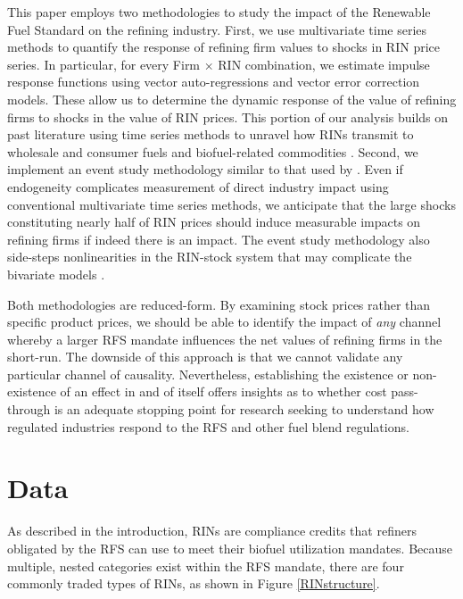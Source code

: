 \documentclass[11pt]{article}
\begin{document}
This paper employs two methodologies to study the impact of the Renewable Fuel Standard on the refining industry. First, we use multivariate time series methods to quantify the response of refining firm values to shocks in RIN price series. In particular, for every Firm $\times$ RIN combination, we estimate impulse response functions using vector auto-regressions and vector error correction models. These allow us to determine the dynamic response of the value of refining firms to shocks in the value of RIN prices. This portion of our analysis builds on past literature using time series methods to unravel how RINs transmit to wholesale and consumer fuels \citep{Knittel2017} and biofuel-related commodities \citep{Whistance2014, Whistance2016}. Second, we implement an event study methodology similar to that used by \cite{Lade2018a}. Even if endogeneity complicates measurement of direct industry impact using conventional multivariate time series methods, we anticipate that the large shocks constituting nearly half of RIN prices should induce measurable impacts on refining firms if indeed there is an impact. The event study methodology also side-steps nonlinearities in the RIN-stock system that may complicate the bivariate models \citep{Serra2011}.

Both methodologies are reduced-form. By examining stock prices rather than specific product prices, we should be able to identify the impact of \textit{any} channel whereby a larger RFS mandate influences the net values of refining firms in the short-run. The downside of this approach is that we cannot validate any particular channel of causality. Nevertheless, establishing the existence or non-existence of an effect in and of itself offers insights as to whether cost pass-through is an adequate stopping point for research seeking to understand how regulated industries respond to the RFS and other fuel blend regulations.

\section{Data}

As described in the introduction, RINs are compliance credits that refiners obligated by the RFS can use to meet their biofuel utilization mandates. Because multiple, nested categories exist within the RFS mandate, there are four commonly traded types of RINs, as shown in Figure \ref{RINstructure}.
\end{document}
